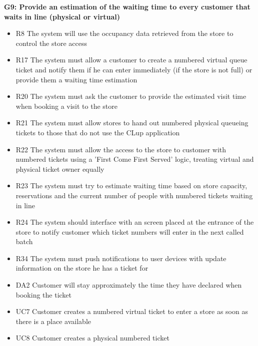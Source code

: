 \vfill
\pagebreak

\textbf{G9: Provide an estimation of the waiting time to every customer that waits in line (physical or virtual)}
\begin{itemize}[label=\textcolor{clup_blue2}{\textbullet}]
    \item R8 The system will use the occupancy data retrieved from the store to control the store access
    \item R17 The system must allow a customer to create a numbered virtual queue ticket and notify them if he can enter immediately (if the store is not full) or provide them a waiting time estimation
    \item R20 The system must ask the customer to provide the estimated visit time when booking a visit to the store
    \item R21 The system must allow stores to hand out numbered physical queueing tickets to those that do not use the CLup application
    \item R22 The system must allow the access to the store to customer with numbered tickets using a ’First Come First Served’ logic, treating virtual and physical ticket owner equally
    \item R23 The system must try to estimate waiting time based on store capacity, reservations and the current number of people with numbered tickets waiting in line
    \item R24 The system should interface with an screen placed at the entrance of the store to notify customer which ticket numbers will enter in the next called batch
    \item R34 The system must push notifications to user devices with update information on the store he has a ticket for
\end{itemize}
\begin{itemize}[label=\textcolor{clup_red}{\textbullet}]
    \item DA2 Customer will stay approximately the time they have declared when booking the ticket
\end{itemize}
\begin{itemize}[label=\textcolor{clup_yellow}{\textbullet}]
    \item UC7 Customer creates a numbered virtual ticket to enter a store as soon as there is a place available
    \item UC8 Customer creates a physical numbered ticket
\end{itemize}

\vfill
\pagebreak

